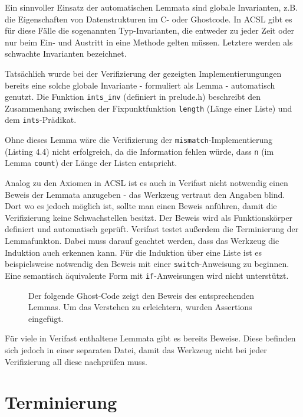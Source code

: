 Ein sinnvoller Einsatz der automatischen Lemmata sind globale Invarianten, z.B. die Eigenschaften von Datenstrukturen
im C- oder Ghostcode. In ACSL gibt es für diese Fälle die sogenannten Typ-Invarianten, die entweder zu jeder Zeit oder
nur beim Ein- und Austritt in eine Methode gelten müssen. Letztere werden als schwachte Invarianten bezeichnet.

Tatsächlich wurde bei der Verifizierung der gezeigten Implementierungungen bereits eine solche
globale Invariante - formuliert als Lemma - automatisch genutzt. Die Funktion \lstinline{ints_inv}
(definiert in prelude.h) beschreibt den Zusammenhang zwischen der Fixpunktfunktion \texttt{length}
(Länge einer Liste) und dem \lstinline{ints}-Prädikat.



Ohne dieses Lemma wäre die Verifizierung der \lstinline{mismatch}-Implementierung (Listing 4.4)
nicht erfolgreich, da die Information fehlen würde, dass \lstinline{n} (im Lemma \lstinline{count})
der Länge der Listen entspricht.

Analog zu den Axiomen in ACSL ist es auch in Verifast nicht notwendig einen Beweis der Lemmata anzugeben -
das Werkzeug vertraut den Angaben blind. Dort wo es jedoch möglich ist, sollte man einen Beweis anführen,
damit die Verifizierung keine Schwachstellen besitzt.
Der Beweis wird als Funktionskörper definiert und automatisch geprüft. Verifast testet außerdem die
Terminierung der Lemmafunkton. 
Dabei muss  darauf geachtet werden, dass das Werkzeug die Induktion auch 
erkennen kann. Für die Induktion über eine Liste ist es beispielsweise notwendig den Beweis mit einer 
\texttt{switch}-Anweisung zu beginnen. Eine semantisch äquivalente Form mit \texttt{if}-Anweisungen wird 
nicht unterstützt.
\begin{figure}[H]
Der folgende Ghost-Code zeigt den Beweis des entsprechenden Lemmas. Um das Verstehen zu erleichtern,
wurden Assertions eingefügt.

\end{figure} 
Für viele in Verifast enthaltene Lemmata gibt es bereits Beweise. Diese befinden sich jedoch in einer separaten
Datei, damit das Werkzeug nicht bei jeder Verifizierung all diese nachprüfen muss.

\section{Terminierung}

